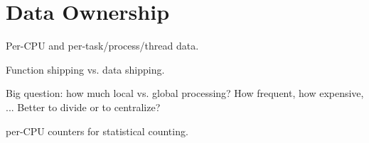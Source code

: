 
\chapter{Data Ownership}

Per-CPU and per-task/process/thread data.

Function shipping vs. data shipping.

Big question: how much local vs. global processing?  How frequent,
how expensive, ...  Better to divide or to centralize?

per-CPU counters for statistical counting.
